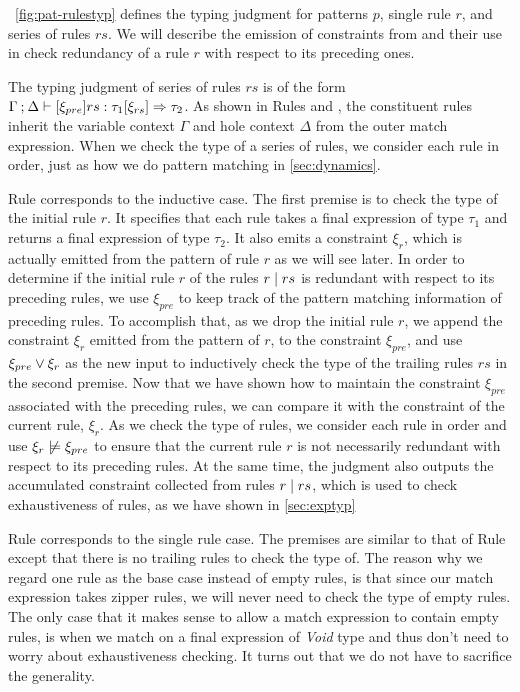 

\figurename~\ref{fig:pat-rulestyp} defines the typing judgment for patterns $p$,
single rule $r$, and series of rules $rs$. We will describe the emission of constraints from and their use in check redundancy of a rule $r$ with respect
to its preceding ones.

The typing judgment of series of rules $rs$ is of the form
$\Gamma \mathbin{;} \Delta \vdash [\xi_{pre}] rs : \tau_1 [\xi_{rs}] \Rightarrow \tau_2$. As shown
in Rules \TMatchZPre and \TMatchNZPre, the constituent rules inherit the
variable context $\Gamma$ and hole context $\Delta$ from the outer match
expression. When we check the type of a series of rules, we consider each rule
in order, just as how we do pattern matching in \autoref{sec:dynamics}.

Rule \TRules corresponds to the inductive case. The first premise is to check
the type of the initial rule $r$. It specifies that each rule takes a final expression
of type $\tau_1$ and returns a final expression of type $\tau_2$. It also emits
a constraint $\xi_r$, which is actually emitted from the pattern of rule $r$ as
we will see later. In order to determine if the initial rule $r$ of the rules
$r \mid rs$ is redundant with respect to its preceding rules, we use
$\xi_{pre}$ to keep track of the pattern matching information of preceding
rules. To accomplish that, as we drop the initial rule $r$, we append the
constraint $\xi_r$ emitted from the pattern of $r$, to the constraint
$\xi_{pre}$, and use $\xi_{pre} \vee \xi_r$ as the new input to inductively check the type
of the trailing rules $rs$ in the second premise. Now that we have shown how to maintain the
constraint $\xi_{pre}$ associated with the preceding rules, we can compare it
with the constraint of the current rule, $\xi_r$. As we check the
type of rules, we consider each rule in order and use
$\cnotsatisfy{\xi_r}{\xi_{pre}}$ to ensure that the current rule $r$ is not necessarily redundant with respect to its preceding rules. At the same time, the judgment also outputs the accumulated
constraint collected from rules $r \mid rs$, which is used to check
exhaustiveness of rules, as we have shown in \autoref{sec:exptyp}

Rule \TOneRules corresponds to the single rule case. The premises are similar to that of Rule \TRules except that
there is no trailing rules to check the type of. The reason why we regard one
rule as the base case instead of empty rules, is that since our match expression
takes zipper rules, we will never need to check the type of empty rules. The
only case that it makes sense to allow a match expression to contain empty
rules, is when we match on a final expression of \textit{Void} type and thus
don't need to worry about exhaustiveness checking. It turns out that we do not
have to sacrifice the generality.

